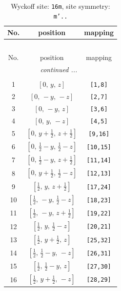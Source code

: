\documentclass[fleqn,8pt]{jsarticle}
\begin{document}
\renewcommand{\arraystretch}{1.2}
\begin{longtable}{ccc}
\caption{Wyckoff site: {\tt 16m}, site symmetry: {\tt m'..}}
 \\
 \hline \hline
No. & position & mapping \\ \hline \endfirsthead

\multicolumn{2}{l}{\tablename\ \thetable{}} \\
 \hline \hline
No. & position & mapping \\ \hline \endhead

 \hline \hline
\multicolumn{2}{r}{\footnotesize\it continued ...} \\ \endfoot

 \hline \hline
\multicolumn{2}{r}{} \\ \endlastfoot

1 & $\left[ 0,\, y,\, z \right]$ & {\tt [1,8]} \\ \hline
2 & $\left[ 0,\, - y,\, - z \right]$ & {\tt [2,7]} \\ \hline
3 & $\left[ 0,\, - y,\, z \right]$ & {\tt [3,6]} \\ \hline
4 & $\left[ 0,\, y,\, - z \right]$ & {\tt [4,5]} \\ \hline
5 & $\left[ 0,\, y + \frac{1}{2},\, z + \frac{1}{2} \right]$ & {\tt [9,16]} \\ \hline
6 & $\left[ 0,\, \frac{1}{2} - y,\, \frac{1}{2} - z \right]$ & {\tt [10,15]} \\ \hline
7 & $\left[ 0,\, \frac{1}{2} - y,\, z + \frac{1}{2} \right]$ & {\tt [11,14]} \\ \hline
8 & $\left[ 0,\, y + \frac{1}{2},\, \frac{1}{2} - z \right]$ & {\tt [12,13]} \\ \hline
9 & $\left[ \frac{1}{2},\, y,\, z + \frac{1}{2} \right]$ & {\tt [17,24]} \\ \hline
10 & $\left[ \frac{1}{2},\, - y,\, \frac{1}{2} - z \right]$ & {\tt [18,23]} \\ \hline
11 & $\left[ \frac{1}{2},\, - y,\, z + \frac{1}{2} \right]$ & {\tt [19,22]} \\ \hline
12 & $\left[ \frac{1}{2},\, y,\, \frac{1}{2} - z \right]$ & {\tt [20,21]} \\ \hline
13 & $\left[ \frac{1}{2},\, y + \frac{1}{2},\, z \right]$ & {\tt [25,32]} \\ \hline
14 & $\left[ \frac{1}{2},\, \frac{1}{2} - y,\, - z \right]$ & {\tt [26,31]} \\ \hline
15 & $\left[ \frac{1}{2},\, \frac{1}{2} - y,\, z \right]$ & {\tt [27,30]} \\ \hline
16 & $\left[ \frac{1}{2},\, y + \frac{1}{2},\, - z \right]$ & {\tt [28,29]} \\
\end{longtable}
\end{document}
